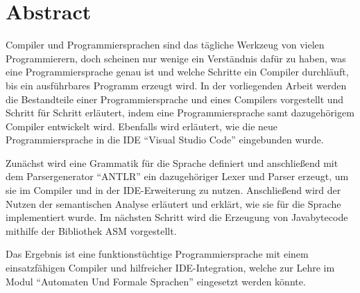 \chapter*{Abstract}

Compiler und Programmiersprachen sind das tägliche Werkzeug von vielen Programmierern, doch scheinen nur wenige ein Verständnis dafür zu haben, was eine Programmiersprache genau ist und welche Schritte ein Compiler durchläuft, bis ein ausführbares Programm erzeugt wird. In der vorliegenden Arbeit werden die Bestandteile einer Programmiersprache und eines Compilers vorgestellt und Schritt für Schritt erläutert, indem eine Programmiersprache samt dazugehörigem Compiler entwickelt wird. Ebenfalls wird erläutert, wie die neue Programmiersprache in die IDE \enquote{Visual Studio Code} eingebunden wurde.

Zunächst wird eine Grammatik für die Sprache definiert und anschließend mit dem Parsergenerator \enquote{ANTLR} ein dazugehöriger Lexer und Parser erzeugt, um sie im Compiler und in der IDE-Erweiterung zu nutzen. Anschließend wird der Nutzen der semantischen Analyse erläutert und erklärt, wie sie für die Sprache implementiert wurde. Im nächsten Schritt wird die Erzeugung von Javabytecode mithilfe der Bibliothek ASM vorgestellt.

Das Ergebnis ist eine funktionstüchtige Programmiersprache mit einem einsatzfähigen Compiler und hilfreicher IDE-Integration, welche zur Lehre im Modul \enquote{Automaten Und Formale Sprachen} eingesetzt werden könnte.
